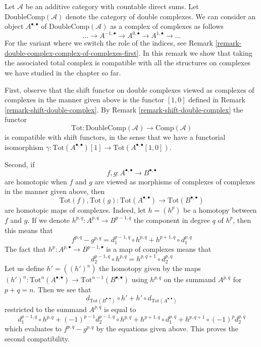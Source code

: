 \begin{remark}
\label{remark-double-complex-complex-of-complexes-second}
Let $\mathcal{A}$ be an additive category with countable direct sums.
Let $\text{DoubleComp}(\mathcal{A})$ denote the category of double complexes.
We can consider an object $A^{\bullet, \bullet}$ of
$\text{DoubleComp}(\mathcal{A})$ as a complex of complexes
as follows
$$
\ldots \to A^{-1, \bullet} \to A^{0, \bullet} \to A^{1, \bullet} \to \ldots
$$
For the variant where we switch the role of the indices, see
Remark \ref{remark-double-complex-complex-of-complexes-first}.
In this remark we show that taking the associated total complex
is compatible with all the structures on complexes we have studied
in the chapter so far.

\medskip\noindent
First, observe that the shift functor on double complexes viewed
as complexes of complexes in the manner given above is the functor
$[1, 0]$ defined in Remark \ref{remark-shift-double-complex}.
By Remark \ref{remark-shift-double-complex} the functor
$$
\text{Tot} : \text{DoubleComp}(\mathcal{A}) \to \text{Comp}(\mathcal{A})
$$
is compatible with shift functors, in the sense that we have a functorial
isomorphism $\gamma : \text{Tot}(A^{\bullet, \bullet})[1] \to
\text{Tot}(A^{\bullet, \bullet}[1, 0])$.

\medskip\noindent
Second, if
$$
f, g : A^{\bullet, \bullet} \to B^{\bullet, \bullet}
$$
are homotopic when $f$ and $g$ are viewed as morphisms of complexes
of complexes in the manner given above, then
$$
\text{Tot}(f), \text{Tot}(g) :
\text{Tot}(A^{\bullet, \bullet}) \to \text{Tot}(B^{\bullet, \bullet})
$$
are homotopic maps of complexes. Indeed, let $h = (h^p)$
be a homotopy between $f$ and $g$. If we denote
$h^{p, q} : A^{p, q} \to B^{p - 1, q}$ the component in degree $q$ of $h^p$,
then this means that
$$
f^{p, q} - g^{p, q} = d_1^{p - 1, q} \circ h^{p, q} +
h^{p + 1, q} \circ d_1^{p, q}
$$
The fact that $h^p : A^{p, \bullet} \to B^{p - 1, \bullet}$ is a map of
complexes means that
$$
d_2^{p - 1, q} \circ h^{p, q} = h^{p, q + 1} \circ d_2^{p, q}
$$
Let us define $h' = ((h')^n)$ the homotopy given by the maps
$(h')^n : \text{Tot}^n(A^{\bullet, \bullet}) \to
\text{Tot}^{n - 1}(B^{\bullet, \bullet})$
using $h^{p, q}$ on the summand $A^{p, q}$ for $p + q = n$.
Then we see that
$$
d_{\text{Tot}(B^{\bullet, \bullet})} \circ h' +
h' \circ d_{\text{Tot}(A^{\bullet, \bullet})}
$$
restricted to the summand $A^{p, q}$ is equal to
$$
d_1^{p - 1, q} \circ h^{p, q} +
(-1)^{p - 1} d_2^{p - 1, q} \circ h^{p, q} +
h^{p + 1, q} \circ d_1^{p, q} +
h^{p, q + 1} \circ (-1)^p d_2^{p, q}
$$
which evaluates to $f^{p, q} - g^{p, q}$ by the equations given above.
This proves the second compatibility.


\end{remark}

